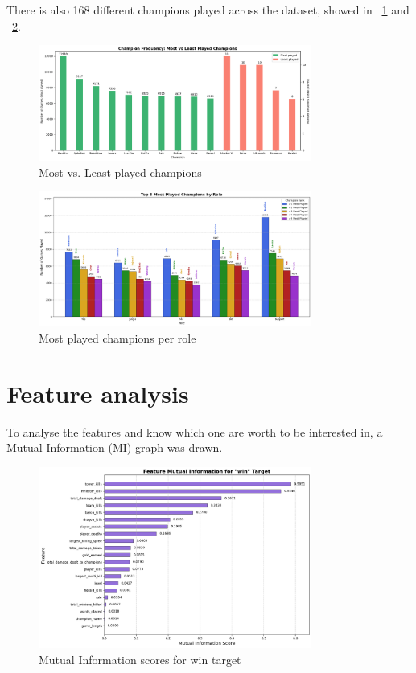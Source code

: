 \documentclass[12pt, a4paper]{article}
\begin{document}
There is also 168 different champions played across the dataset, showed in \figurename~\ref{fig:champions_played} and \figurename~\ref{fig:champions_played_per_role}.

\begin{figure}[!ht]
    \centering
    \includegraphics[width=0.8\textwidth]{figures/0_visualization_most_played_champs.png}
    \caption{Most vs. Least played champions}
    \label{fig:champions_played}
\end{figure}

\begin{figure}[!ht]
    \centering
    \includegraphics[width=0.8\textwidth]{figures/0_visualization_most_played_champs_by_role.png}
    \caption{Most played champions per role}
    \label{fig:champions_played_per_role}
\end{figure}

\section{Feature analysis}
To analyse the features and know which one are worth to be interested in, a Mutual Information (MI) graph was drawn.

\begin{figure}[!ht]
    \centering
    \includegraphics[width=0.8\textwidth]{figures/0_visualization_features_MI.png}
    \caption{Mutual Information scores for win target}
    \label{fig:mutual_information}
\end{figure}
\end{document}

